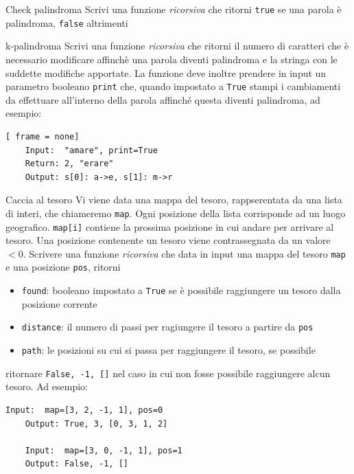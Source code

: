 \begin{esercizio}{Check palindroma}
	Scrivi una funzione \textit{ricorsiva} che ritorni \verb|true| se una parola è palindroma, \verb|false| altrimenti
\end{esercizio}

\begin{esercizio}{k-palindroma}
	Scrivi una funzione \textit{ricorsiva} che ritorni il numero di caratteri che è necessario modificare affinchè una parola diventi palindroma e la stringa con le suddette modifiche apportate. La funzione deve inoltre prendere in input un parametro booleano \verb|print| che, quando impostato a \verb|True| stampi i cambiamenti da effettuare all'interno della parola affinché questa diventi palindroma, ad esempio:
	\begin{lstlisting}[ frame = none]
    Input:  "amare", print=True
    Return: 2, "erare"
    Output: s[0]: a->e, s[1]: m->r 
  \end{lstlisting}
\end{esercizio}

\begin{esercizio}{Caccia al tesoro}
	Vi viene data una mappa del tesoro, rappserentata da una lista di interi, che chiameremo \verb|map|. Ogni posizione della lista corrisponde ad un luogo geografico. \verb|map[i]| contiene la prossima posizione in cui andare per arrivare al tesoro. Una posizione contenente un tesoro viene contrassegnata da un valore $ < 0 $.
	\vskip3mm
	Scrivere una funzione \textit{ricorsiva} che data in input una mappa del tesoro \verb|map| e una posizione \verb|pos|, ritorni
	\begin{itemize}
		\item \verb|found|: booleano impostato a \verb|True| se è possibile raggiungere un tesoro dalla posizione corrente
		\item \verb|distance|: il numero di passi per ragiungere il tesoro a partire da \verb|pos|
		\item \verb|path|: le posizioni su cui si passa per raggiungere il tesoro, se possibile
	\end{itemize}
	ritornare \verb|False, -1, []| nel caso in cui non fosse possibile raggiungere alcun tesoro. Ad esempio:
	\begin{lstlisting}[frame = none]
    Input:  map=[3, 2, -1, 1], pos=0
    Output: True, 3, [0, 3, 1, 2]

    Input:  map=[3, 0, -1, 1], pos=1
    Output: False, -1, []
  \end{lstlisting}
\end{esercizio}

